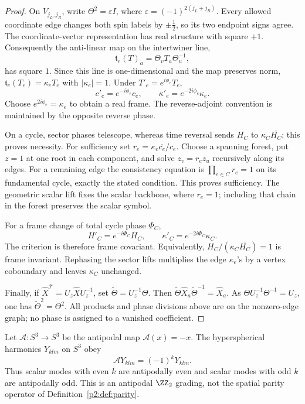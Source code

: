 \documentclass[11pt,a4paper]{article}
\begin{document}
\begin{proof}
On \(V_{j_L,j_R}\), write
\(\Theta^2=\varepsilon I\), where
\(\varepsilon=(-1)^{2(j_L+j_R)}\).
Every allowed coordinate edge changes both spin labels by
\(\pm\tfrac12\), so its two endpoint signs agree.
The coordinate-vector representation has real structure with square \(+1\).
Consequently the anti-linear map on the intertwiner line,
\[
 \mathfrak t_e(T)_a=\Theta_vT_a\Theta_u^{-1},
\]
has square \(1\).  Since this line is one-dimensional and the map preserves
norm, \(\mathfrak t_e(T_e)=\kappa_eT_e\) with \(|\kappa_e|=1\).
Under \(T'_e=e^{i\phi_e}T_e\),
\[
 c'_e=e^{-i\phi_e}c_e,\qquad
 \kappa'_e=e^{-2i\phi_e}\kappa_e.
\]
Choose \(e^{2i\phi_e}=\kappa_e\) to obtain a real frame.
The reverse-adjoint convention is maintained by the opposite reverse phase.

On a cycle, sector phases telescope, whereas time reversal sends
\(H_C\) to \(\kappa_C\overline{H_C}\); this proves necessity.
For sufficiency set \(r_e=\kappa_e\overline{c_e}/c_e\).
Choose a spanning forest, put \(z=1\) at one root in each component, and
solve \(z_v=r_ez_u\) recursively along its edges.
For a remaining edge the consistency equation is
\(\prod_{e\in C}r_e=1\) on its fundamental cycle, exactly the stated
condition.  This proves sufficiency.
The geometric scalar lift fixes the scalar backbone, where \(r_e=1\);
including that chain in the forest preserves the scalar symbol.

For a frame change of total cycle phase \(\Phi_C\),
\[
 H'_C=e^{-i\Phi_C}H_C,\qquad
 \kappa'_C=e^{-2i\Phi_C}\kappa_C.
\]
The criterion is therefore frame covariant.  Equivalently,
\(H_C/(\kappa_C\overline{H_C})=1\) is frame invariant.
Rephasing the sector lifts multiplies the edge \(\kappa_e\)'s by a
vertex coboundary and leaves \(\kappa_C\) unchanged.

Finally, if
\(\widehat X^{\mathcal T}=U_z\widehat XU_z^{-1}\), set
\(\widetilde\Theta=U_z^{-1}\Theta\).
Then \(\widetilde\Theta\widehat X_a\widetilde\Theta^{-1}
=\widehat X_a\).
As \(\Theta U_z^{-1}\Theta^{-1}=U_z\), one has
\(\widetilde\Theta^2=\Theta^2\).
All products and phase divisions above are on the nonzero-edge graph;
no phase is assigned to a vanished coefficient.
\end{proof}

\begin{corollary}
\label{p2:cor:antipodal-eigenstates}
Let $\mathcal A:S^3\to S^3$ be the antipodal map $\mathcal A(x)=-x$. The hyperspherical harmonics $Y_{klm}$ on $S^3$ obey \cite{Camporesi1991}
\begin{equation}
\mathcal{A} Y_{klm} = (-1)^k Y_{klm}.
\end{equation}
Thus scalar modes with even $k$ are antipodally even and scalar modes with odd $k$ are antipodally odd. This is an antipodal $\ZZ_2$ grading, not the spatial parity operator of Definition~\ref{p2:def:parity}.
\end{corollary}
\end{document}

